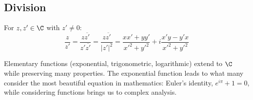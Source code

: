 \subsection{Division}

For $z, z' \in \C$ with $z' \neq 0$:
\[
    \frac{z}{z'} = \frac{z\overline{z'}}{z'\overline{z'}} = \frac{z\overline{z'}}{|z'|^2}=\frac{xx'+yy'}{x'^2+y'^2}+i \frac{x'y-y'x}{x'^2+y'^2}
\]

\begin{note}
    Elementary functions (exponential, trigonometric, logarithmic) extend to $\C$ while preserving many properties. The exponential function leads to what many consider the most beautiful equation in mathematics: Euler's identity, $e^{i\pi} + 1 = 0$, while considering functions brings us to complex analysis.
\end{note}